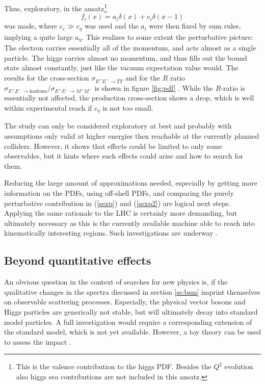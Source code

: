 \documentclass[final,twoside,12pt]{article}
\newcommand*{\no}{\noindent}
\newcommand*{\be}{\begin{equation}}
\newcommand*{\ee}{\end{equation}}
\newcommand*{\pref}[1]{(\ref{#1})}
\newcommand*{\1}{1\!\!\!\bot}
\begin{document}
Thus, exploratory, in \cite{Egger:2017tkd} the ansatz\footnote{This is the valence contribution to the higgs PDF. Besides the $Q^2$ evolution also higgs sea contributions \cite{Bauer:2017isx,Bauer:2018arx,Bauer:2018xag} are not included in this ansatz.}
\be
f_i(x)=a_i\delta(x)+c_i\delta(x-1)\label{pdfansatz}
\ee
\no was made, where $c_e\gg c_\eta$ was used and the $a_i$ were then fixed by sum rules, implying a quite large $a_\eta$. This realizes to some extent the perturbative picture: The electron carries essentially all of the momentum, and acts almost as a single particle. The higgs carries almost no momentum, and thus fills out the bound state almost constantly, just like the vacuum expectation value would. The results for the cross-section $\sigma_{E^+E^-\to\bar{T}T}$ and for the $R$ ratio $\sigma_{E^+E^-\to\text{hadrons}}/\sigma_{E^+E^-\to M^+M^-}$ is shown in figure \ref{fig:pdf} \cite{Egger:2017tkd,Maas:2017swq}. While the $R$-ratio is essentially not affected, the production cross-section shows a drop, which is well within experimental reach if $c_\eta$ is not too small.

The study can only be considered exploratory at best and probably with assumptions only valid at higher energies then reachable at the currently planned colliders. However, it shows that effects could be limited to only some observables, but it hints where such effects could arise and how to search for them.

Reducing the large amount of approximations needed, especially by getting more information on the PDFs, using off-shell PDFs, and comparing the purely perturbative contribution in \pref{sexp} and \pref{sexp2} are logical next steps. Applying the same rationale to the LHC is certainly more demanding, but ultimately necessary as this is the currently available machine able to reach into kinematically interesting regions. Such investigations are underway \cite{Maas:unpublished,Fernbach:unpublished}.

\subsection{Beyond quantitative effects}\label{ss:qscattering}

An obvious question in the context of searches for new physics is, if the qualitative changes in the spectra discussed in section \ref{ss:bsm} imprint themselves on observable scattering processes. Especially, the physical vector bosons and Higgs particles are generically not stable, but will ultimately decay into standard model particles. A full investigation would require a corresponding extension of the standard model, which is not yet available. However, a toy theory can be used to assess the impact \cite{Torek:2018qet}.
\end{document}
